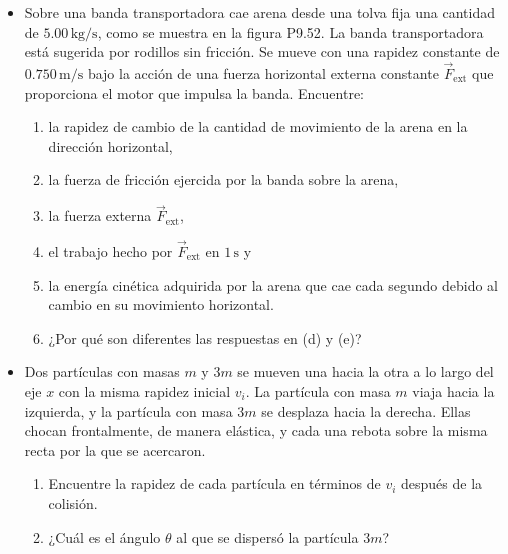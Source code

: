 \documentclass[11pt,a4paper]{article}
\begin{document}
\begin{itemize}
    \item[\textbf{52.}] Sobre una banda transportadora cae arena desde una tolva fija una cantidad de \(5.00\,\text{kg/s}\), como se muestra en la figura P9.52. La banda transportadora está sugerida por rodillos sin fricción. Se mueve con una rapidez constante de \(0.750\,\text{m/s}\) bajo la acción de una fuerza horizontal externa constante \(\vec{F}_{\text{ext}}\) que proporciona el motor que impulsa la banda. Encuentre:
    \begin{enumerate}
        \item la rapidez de cambio de la cantidad de movimiento de la arena en la dirección horizontal,
        \item la fuerza de fricción ejercida por la banda sobre la arena,
        \item la fuerza externa \(\vec{F}_{\text{ext}}\),
        \item el trabajo hecho por \(\vec{F}_{\text{ext}}\) en \(1\,\text{s}\) y
        \item la energía cinética adquirida por la arena que cae cada segundo debido al cambio en su movimiento horizontal.
        \item ¿Por qué son diferentes las respuestas en (d) y (e)?
    \end{enumerate}
    \vspace*{8cm}

    \item[\textbf{53.}] Dos partículas con masas \(m\) y \(3m\) se mueven una hacia la otra a lo largo del eje \(x\) con la misma rapidez inicial \(v_i\). La partícula con masa \(m\) viaja hacia la izquierda, y la partícula con masa \(3m\) se desplaza hacia la derecha. Ellas chocan frontalmente, de manera elástica, y cada una rebota sobre la misma recta por la que se acercaron.
    \begin{enumerate}
        \item Encuentre la rapidez de cada partícula en términos de \(v_i\) después de la colisión.
        \item ¿Cuál es el ángulo \(\theta\) al que se dispersó la partícula \(3m\)?
    \end{enumerate}
    \vspace*{6cm}
\end{itemize}

\newpage
\end{document}

